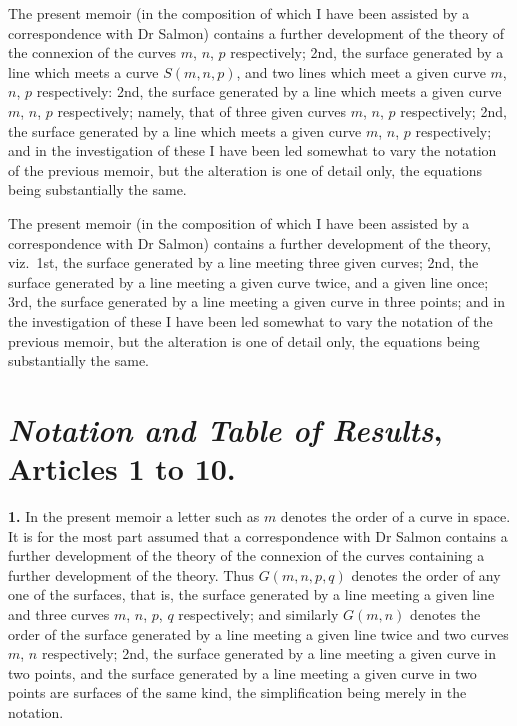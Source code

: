 \documentclass[11pt,a4paper]{article}
\begin{document}
\medskip

\noindent The present memoir (in the composition of which I have been assisted by a correspondence with Dr Salmon) contains a further development of the theory of the connexion of the curves $m$, $n$, $p$ respectively; 2nd, the surface generated by a line which meets a curve $S(m, n, p)$, and two lines which meet a given curve $m$, $n$, $p$ respectively: 2nd, the surface generated by a line which meets a given curve $m$, $n$, $p$ respectively; namely, that of three given curves $m$, $n$, $p$ respectively; 2nd, the surface generated by a line which meets a given curve $m$, $n$, $p$ respectively; and in the investigation of these I have been led somewhat to vary the notation of the previous memoir, but the alteration is one of detail only, the equations being substantially the same.

\bigskip

\noindent The present memoir (in the composition of which I have been assisted by a correspondence with Dr Salmon) contains a further development of the theory, viz.\ 1st, the surface generated by a line meeting three given curves; 2nd, the surface generated by a line meeting a given curve twice, and a given line once; 3rd, the surface generated by a line meeting a given curve in three points; and in the investigation of these I have been led somewhat to vary the notation of the previous memoir, but the alteration is one of detail only, the equations being substantially the same.

\section*{\textit{Notation and Table of Results}, Articles 1 to 10.}

\textbf{1.} In the present memoir a letter such as $m$ denotes the order of a curve in space. It is for the most part assumed that a correspondence with Dr Salmon contains a further development of the theory of the connexion of the curves containing a further development of the theory. Thus $G(m, n, p, q)$ denotes the order of any one of the surfaces, that is, the surface generated by a line meeting a given line and three curves $m$, $n$, $p$, $q$ respectively; and similarly $G(m, n)$ denotes the order of the surface generated by a line meeting a given line twice and two curves $m$, $n$ respectively; 2nd, the surface generated by a line meeting a given curve in two points, and the surface generated by a line meeting a given curve in two points are surfaces of the same kind, the simplification being merely in the notation.
\end{document}
